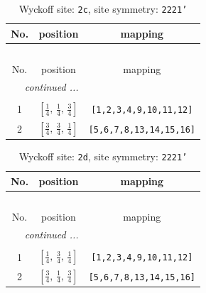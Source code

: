 \documentclass[fleqn,8pt]{jsarticle}
\begin{document}
\renewcommand{\arraystretch}{1.2}
\begin{longtable}{ccc}
\caption{Wyckoff site: {\tt 2c}, site symmetry: {\tt 2221'}}
 \\
 \hline \hline
No. & position & mapping \\ \hline \endfirsthead

\multicolumn{2}{l}{\tablename\ \thetable{}} \\
 \hline \hline
No. & position & mapping \\ \hline \endhead

 \hline \hline
\multicolumn{2}{r}{\footnotesize\it continued ...} \\ \endfoot

 \hline \hline
\multicolumn{2}{r}{} \\ \endlastfoot

1 & $\left[ \frac{1}{4},\, \frac{1}{4},\, \frac{3}{4} \right]$ & {\tt [1,2,3,4,9,10,11,12]} \\ \hline
2 & $\left[ \frac{3}{4},\, \frac{3}{4},\, \frac{1}{4} \right]$ & {\tt [5,6,7,8,13,14,15,16]} \\
\end{longtable}
\renewcommand{\arraystretch}{1.2}
\begin{longtable}{ccc}
\caption{Wyckoff site: {\tt 2d}, site symmetry: {\tt 2221'}}
 \\
 \hline \hline
No. & position & mapping \\ \hline \endfirsthead

\multicolumn{2}{l}{\tablename\ \thetable{}} \\
 \hline \hline
No. & position & mapping \\ \hline \endhead

 \hline \hline
\multicolumn{2}{r}{\footnotesize\it continued ...} \\ \endfoot

 \hline \hline
\multicolumn{2}{r}{} \\ \endlastfoot

1 & $\left[ \frac{1}{4},\, \frac{3}{4},\, \frac{1}{4} \right]$ & {\tt [1,2,3,4,9,10,11,12]} \\ \hline
2 & $\left[ \frac{3}{4},\, \frac{1}{4},\, \frac{3}{4} \right]$ & {\tt [5,6,7,8,13,14,15,16]} \\
\end{longtable}
\renewcommand{\arraystretch}{1.2}
\end{document}
